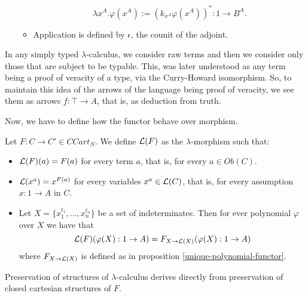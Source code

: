 \begin{definition}
\begin{definition}
\begin{itemize}
\begin{itemize}
      $$\lambda x^A.\varphi(x^A) := \left( k_{x^A}\varphi(x^A)\right)^*: 1 \to B^A.$$
      \item Application is defined by $\epsilon$, the counit of the adjoint.
    \end{itemize}
  \end{itemize}

\end{definition}


\begin{remark}
  In any simply typed $\lambda$-calculus, we consider raw terms and then we consider only those that are subject to be typable. This, was later understood as any term being a proof of veracity of a type, via the Curry-Howard isomorphism. So, to maintain this idea of the arrows of the language being proof of veracity, we see them as arrows $f:\top \to A$, that is, as deduction from truth. \\
\end{remark}

Now, we have to define how the functor behave over morphism.

\begin{definition}
  Let $F:C\to C'\in CCart_N$. We define $\mathcal{L} (F)$ as the $\lambda$-morphism such that:
  \begin{itemize}
  \item $\mathcal{L} (F) (a)= F(a)$ for every term $a$, that is, for every $a\in Ob(C)$.
  \item $\mathcal{L} (x^a) = x^{F(a)}$ for every variables $x^a \in\mathcal{L}(C)$, that is, for every assumption $x: 1 \to A$ in $C$.
  \item Let $X= \{x_1^{t_1},...,x_n^{t_n}\}$ be a set of indeterminates. Then for ever polynomial $\varphi$ over $X$ we have that
    $$\mathcal{L}(F)(\varphi(X):1 \to A) = F_{X\to \mathcal{L}(X)}(\varphi(X):1 \to A)$$  where $F_{X\to \mathcal{L}(X)}$ is defined as in proposition \ref{unique-polynomial-functor}.
  \end{itemize}
\end{definition}

\begin{remark}
  Preservation of structures of $\lambda$-calculus derives directly from preservation of closed cartesian structures of $F$.
\end{remark}


\end{definition}
